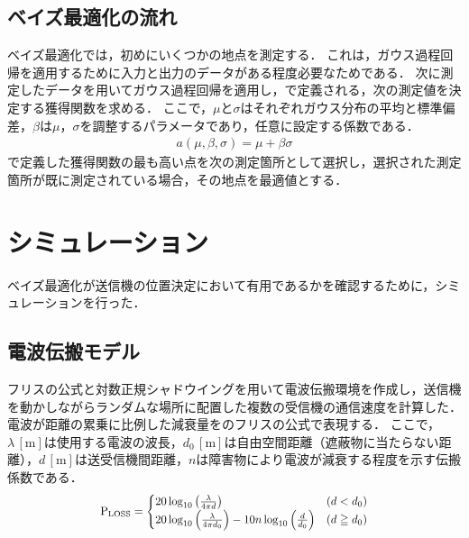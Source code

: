 \documentclass[twocolumn]{ltjarticle}
\begin{document}
\subsection{ベイズ最適化の流れ}

ベイズ最適化では，初めにいくつかの地点を測定する．
これは，ガウス過程回帰を適用するために入力と出力のデータがある程度必要なためである．
次に測定したデータを用いてガウス過程回帰を適用し，で定義される，次の測定値を決定する獲得関数を求める．
ここで，\(\mu\)と\(\sigma\)はそれぞれガウス分布の平均と標準偏差，\(\beta\)は\(\mu\)，\(\sigma\)を調整するパラメータであり，任意に設定する係数である．
\begin{align}
	a(\mu, \beta, \sigma) = \mu + \beta \sigma \label{eq:acquisition}
\end{align}
で定義した獲得関数の最も高い点を次の測定箇所として選択し，選択された測定箇所が既に測定されている場合，その地点を最適値とする．
\section{シミュレーション}

ベイズ最適化が送信機の位置決定において有用であるかを確認するために，シミュレーションを行った．
\subsection{電波伝搬モデル}

フリスの公式と対数正規シャドウイングを用いて電波伝搬環境を作成し，送信機を動かしながらランダムな場所に配置した複数の受信機の通信速度を計算した．
電波が距離の累乗に比例した減衰量をのフリスの公式で表現する．
ここで，\(\lambda\,\mathrm{[m]}\)は使用する電波の波長，\(d_0\,\mathrm{[m]}\)は自由空間距離（遮蔽物に当たらない距離），\(d\,\mathrm{[m]}\)は送受信機間距離，\(n\)は障害物により電波が減衰する程度を示す伝搬係数である．
\begin{align}
	\scalebox{0.9}{
		\(
		\mathrm{P_{LOSS}} =
		\begin{cases}
			20 \log_{10} \left( \frac{\lambda}{4 \pi d} \right)                                                & (d < d_0)     \\
			20 \log_{10} \left( \frac{\lambda}{4 \pi d_0} \right) - 10n \log_{10} \left( \frac{d}{d_0} \right) & (d \geqq d_0)
		\end{cases} \label{eq:friss}
		\)
	}
\end{align}
\end{document}
